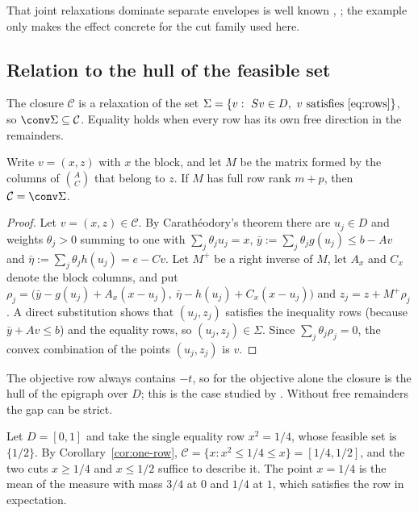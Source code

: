 That joint relaxations dominate separate envelopes is well known
\citep[Lemma~3.4]{Nowak2005}, \citep{Tawarmalani2010,LiersEtAl2021}; the
example only makes the effect concrete for the cut family used here.

\subsection{Relation to the hull of the feasible set}\label{sec:feasible-hull}

The closure $\mathcal C$ is a relaxation of the set
$\Sigma=\{v:\ Sv\in D,\ v\text{ satisfies~\eqref{eq:rows}}\}$, so
$\conv\Sigma\subseteq\mathcal C$. Equality holds when every row has its own free
direction in the remainders.

\begin{proposition}\label{prop:free-remainders}
Write $v=(x,z)$ with $x$ the block, and let $M$ be the matrix formed by the
columns of $\binom AC$ that belong to $z$. If $M$ has full row rank $m+p$,
then $\mathcal C=\conv\Sigma$.
\end{proposition}

\begin{proof}
Let $v=(x,z)\in\mathcal C$. By Carath\'eodory's theorem there are $u_j\in D$ and
weights $\theta_j>0$ summing to one with $\sum_j\theta_ju_j=x$,
$\bar y:=\sum_j\theta_jg(u_j)\le b-Av$ and $\bar\eta:=\sum_j\theta_jh(u_j)=e-Cv$.
Let $M^+$ be a right inverse of $M$, let $A_x$ and $C_x$ denote the block
columns, and put
$\rho_j=\bigl(\bar y-g(u_j)+A_x(x-u_j),\ \bar\eta-h(u_j)+C_x(x-u_j)\bigr)$ and
$z_j=z+M^+\rho_j$. A direct substitution shows that $(u_j,z_j)$ satisfies
the inequality rows (because $\bar y+Av\le b$) and the equality rows, so
$(u_j,z_j)\in\Sigma$. Since $\sum_j\theta_j\rho_j=0$, the convex combination
of the points $(u_j,z_j)$ is $v$.
\end{proof}

The objective row always contains $-t$, so for the objective alone the
closure is the hull of the epigraph over $D$; this is the case studied by
\citet{LiersEtAl2021}. Without free remainders the gap can be strict.

\begin{example}\label{ex:quarter}
Let $D=[0,1]$ and take the single equality row $x^2=1/4$, whose feasible
set is $\{1/2\}$. By Corollary~\ref{cor:one-row}, $\mathcal C=\{x:x^2\le1/4\le x\}=[1/4,1/2]$,
and the two cuts $x\ge1/4$ and $x\le1/2$ suffice to describe it. The
point $x=1/4$ is the mean of the measure with mass $3/4$ at $0$ and $1/4$
at $1$, which satisfies the row in expectation.
\end{example}


